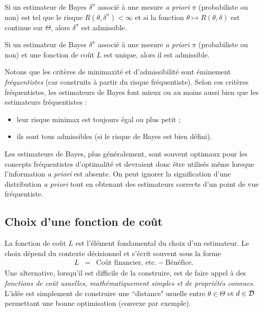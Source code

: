 
\begin{theorem}
Si un estimateur de Bayes $\delta^{\pi}$ associé à une mesure {\it a priori} $\pi$ (probabiliste ou non) est tel que le risque $R(\theta,\delta^{\pi})<\infty$ et si la fonction $\theta\mapsto R(\theta,\delta)$ est continue sur $\Theta$, alors $\delta^{\pi}$ est admissible.
\end{theorem}


\if{} 
\fi


\begin{theorem}
Si un estimateur de Bayes $\delta^{\pi}$ associé à une mesure {\it a priori} $\pi$ (probabiliste ou non) et une fonction de coût $L$ est unique, alors il est admissible.
\end{theorem}

\if{} 
\fi


Notons que les critères de minimaxité et d'admissibilité sont éminement  \emph{fréquentistes} (car construits à partir du risque fréquentiste). Selon ces critères fréquentistes, les estimateurs de Bayes font mieux ou au moins aussi bien que les estimateurs fréquentistes :
\begin{itemize}
\item leur risque minimax est toujours égal ou plus petit ;
\item ils sont tous admissibles (si le risque de Bayes est bien défini).
\end{itemize}

Les estimateurs de Bayes, plus généralement, sont souvent optimaux pour les concepts fréquentistes d'optimalité et devraient donc \^etre utilisés m\^eme lorsque l'information {\it a priori} est absente. On peut ignorer la signification d'une distribution {\it a priori} tout en obtenant des estimateurs corrects d'un point de vue fréquentiste. 

\subsection{Choix d'une fonction de coût}

La fonction de co\^ut $L$ est l'élément fondamental du choix d'un estimateur. Le choix dépend du contexte décisionnel et s'écrit souvent sous la forme
\begin{eqnarray*}
L & = & \text{Co\^ut financier, etc.} - \text{Bénéfice}.
\end{eqnarray*}
Une alternative, lorsqu'il est difficile de la construire, est de faire appel à des  \emph{fonctions de co\^ut usuelles, mathématiquement simples et de propriétés connues}. L'idée est simplement de construire une ``distance" usuelle entre $\theta\in\Theta$ et $d\in{\cal{D}}$ permettant une bonne optimisation (convexe par exemple). \\


